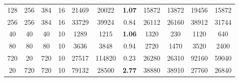 \begin{table}[t!]
\begin{tabular}{cccc|ccc|cccc}
128 & 256 & 384 & 16 & 21469 & 20022 & \bf 1.07 & 15872 & 13872 & 19456 & 15872 \\ 
256 & 256 & 384 & 16 & 33729 & 39924 & 0.84 & 26112 & 26160 & 38912 & 31744 \\
40 & 40 & 40 & 10 & 1289 & 1215 & \bf 1.06 & 1320 & 230 & 1120 & 640 \\ 
80 & 80 & 80 & 10 & 3636 & 3848 & 0.94 & 2720 & 1470 & 3520 & 2400 \\ 
720 & 20 & 720 & 10 & 27517 & 114820 & 0.23 & 26280 & 26310 & 92160 & 59040 \\
20 & 720 & 720 & 10 & 79132 & 28500 & \bf 2.77 & 38880 & 38910 & 27760 & 26840 \\ 

\bottomrule
\end{tabular}
\end{table}


